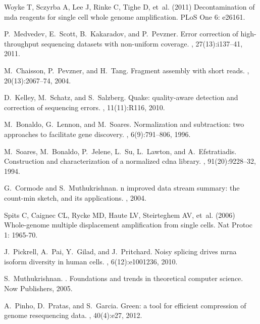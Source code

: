 \documentclass{pnastwo}
\begin{document}
\begin{article}
\begin{thebibliography}{20}
Woyke T, Sczyrba A, Lee J, Rinke C, Tighe D, et~al. (2011) Decontamination of
  mda reagents for single cell whole genome amplification.
\newblock PLoS One 6: e26161.

P.~Medvedev, E.~Scott, B.~Kakaradov, and P.~Pevzner.
\newblock Error correction of high-throughput sequencing datasets with
  non-uniform coverage.
, 27(13):i137--41, 2011.

M.~Chaisson, P.~Pevzner, and H.~Tang.
\newblock Fragment assembly with short reads.
, 20(13):2067--74, 2004.

D.~Kelley, M.~Schatz, and S.~Salzberg.
\newblock Quake: quality-aware detection and correction of sequencing errors.
, 11(11):R116, 2010.

M.~Bonaldo, G.~Lennon, and M.~Soares.
\newblock Normalization and subtraction: two approaches to facilitate gene
  discovery.
, 6(9):791--806, 1996.

M.~Soares, M.~Bonaldo, P.~Jelene, L.~Su, L.~Lawton, and A.~Efstratiadis.
\newblock Construction and characterization of a normalized cdna library.
, 91(20):9228--32, 1994.

G.~Cormode and S.~Muthukrishnan.
n improved data stream summary: the count-min sketch, and its
  applications.
, 2004.

Spits C, Caignec CL, Rycke MD, Haute LV, Steirteghem AV, et~al. (2006)
  Whole-genome multiple displacement amplification from single cells.
\newblock Nat Protoc 1: 1965-70.

J.~Pickrell, A.~Pai, Y.~Gilad, and J.~Pritchard.
\newblock Noisy splicing drives mrna isoform diversity in human cells.
, 6(12):e1001236, 2010.

S.~Muthukrishnan.
.
\newblock Foundations and trends in theoretical computer science. Now
  Publishers, 2005.

A.~Pinho, D.~Pratas, and S.~Garcia.
\newblock Green: a tool for efficient compression of genome resequencing data.
, 40(4):e27, 2012.


\end{thebibliography}
\end{article}
\end{document}
